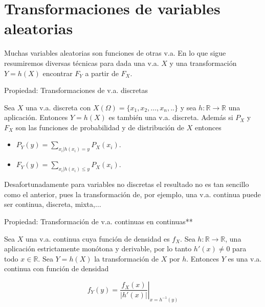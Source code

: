 \documentclass[
  letterpaper,
  DIV=11,
  numbers=noendperiod]{scrreprt}
\providecommand{\tightlist}{%
  \setlength{\itemsep}{0pt}\setlength{\parskip}{0pt}}\usepackage{longtable,booktabs,array}
\begin{document}
\section{Transformaciones de variables
aleatorias}\label{transformaciones-de-variables-aleatorias}

Muchas variables aleatorias son funciones de otras v.a. En lo que sigue
resumiremos diversas técnicas para dada una v.a. \(X\) y una
transformación \(Y=h(X)\) encontrar \(F_{Y}\) a partir de \(F_{X}\).

\begin{Proposicion}{Propiedad: Transformaciones de v.a. discretas}{}

Sea \(X\) una v.a. discreta con
\(X(\Omega)=\{x_1,x_2,\ldots,x_{n},..\}\) y sea
\(h:\mathbb{R}\to\mathbb{R}\) una aplicación. Entonces \(Y=h(X)\) es
también una v.a. discreta. Además si \(P_X\) y \(F_{X}\) son las
funciones de probabilidad y de distribución de \(X\) entonces

\begin{itemize}
\tightlist
\item
  \(\displaystyle P_{Y}(y)=\sum_{x_{i}|h(x_{i})=y}P_X(x_{i}).\)
\item
  \(\displaystyle F_{Y}(y)=\sum_{x_{i}|h(x_{i})\leq y} P_X(x_{i}).\)
\end{itemize}

\end{Proposicion}

Desafortunadamente para variables no discretas el resultado no es tan
sencillo como el anterior, pues la transformación de, por ejemplo, una
v.a. continua puede ser continua, discreta, mixta,\(\ldots\)

\begin{Proposicion}{Propiedad: Transformación de v.a. continuas en continuas**}{}

Sea \(X\) una v.a. continua cuya función de densidad es \(f_{X}\). Sea
\(h:\mathbb{R}\to\mathbb{R}\), una aplicación estrictamente monótona y
derivable, por lo tanto \(h'(x)\not=0\) para todo \(x\in\mathbb{R}\).
Sea \(Y=h(X)\) la transformación de \(X\) por \(h\). Entonces \(Y\) es
una v.a. continua con función de densidad

\[f_{Y}(y)=\left.\frac{f_{X}(x)}
{\left|h'(x)\right|}\right|_{x=h^{-1}(y)}\]

\end{Proposicion}
\end{document}
